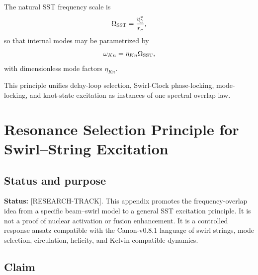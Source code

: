     The natural SST frequency scale is
    \begin{equation}
        \Omega_{\rm SST}
        =
        \frac{v_{\!\boldsymbol{\circlearrowleft}}^{\ast}}{r_c},
    \end{equation}
    so that internal modes may be parametrized by
    \begin{equation}
        \omega_{Kn}
        =
        \eta_{Kn}\Omega_{\rm SST},
    \end{equation}
    with dimensionless mode factors \(\eta_{Kn}\).
    
    This principle unifies delay-loop selection, Swirl-Clock phase-locking,
    mode-locking, and knot-state excitation as instances of one spectral
    overlap law.
    
    
\section{Resonance Selection Principle for Swirl--String Excitation}
    \label{app:resonance-selection-principle}
    
    \subsection*{Status and purpose}
        
        \noindent
        \textbf{Status:} [RESEARCH-TRACK].
        This appendix promotes the frequency-overlap idea from a specific beam--swirl model to a general SST excitation principle. It is not a proof of nuclear activation or fusion enhancement. It is a controlled response ansatz compatible with the Canon-v0.8.1 language of swirl strings, mode selection, circulation, helicity, and Kelvin-compatible dynamics.
    
    \subsection*{Claim}
        

